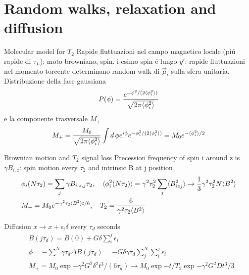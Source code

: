 \section{Random walks, relaxation and diffusion}

\begin{frame}{Molecular model for $T_2$}
Rapide fluttuazioni nel campo magnetico locale (pi\'u rapide di $\tau_L$): moto browniano, spin.
i-esimo spin \'e lungo $y'$: rapide fluttuazioni nel momento torcente determinano random walk di $\vec{\mu}_i$ sulla sfera unitaria. Distribuzione della fase gaussiana
\begin{equation*}
P(\phi)=\frac{e^{-\phi^2/(2\langle \phi_i^2 \rangle)}}{\sqrt{2\pi\langle \phi_i^2 \rangle}}    
\end{equation*}
e la componente trasversale $M_+$
\begin{equation*}
M_+=\frac{M_0}{\sqrt{2\pi\langle \phi_i^2 \rangle}}\int d\,\phi e^{i\phi}e^{-\phi_i^2/(2\langle \phi_i^2 \rangle)}=M_0e^{-\langle \phi_i^2 \rangle/2}
\end{equation*}
\begin{block}{Brownian motion and $T_2$ signal loss}
Precession frequency of spin i around z is $\gamma B_{i,z}$: spin motion every $\tau_2$ and intrinsic B at j position
\begin{align*}
&\phi_i(N\tau_2)=\sum_j\gamma B_{i,z,j}\tau_2,\quad \langle \phi_i^2(N\tau_2) \rangle=\gamma^2\tau_2^2\sum_j\langle B_{izj}^2 \rangle\to\frac{1}{3}\gamma^2\tau_2^2N\langle B^2 \rangle\\
&M_+=M_0e^{-\gamma^2\tau_2\langle B^2 \rangle t/6},\quad T_2=\frac{6}{\gamma^2\tau_2\langle B^2 \rangle}
\end{align*}
\end{block}
\end{frame}

\begin{frame}{Diffusion}
$x\to x+\epsilon_i\delta$ every $\tau_d$ seconds
\begin{align*}
&B(j\tau_d)=B(0)+G\delta\sum_i^j\epsilon_i\\
&\phi=-\sum^N\gamma\tau_d\Delta B(j\tau_d)=-G\delta\gamma\tau_d\sum_j^N\sum_i^j\epsilon_i\\
&M_+=M_0\exp{-\gamma^2 G^2\delta^2 t^3/(6\tau_d)}\to M_0\exp{-t/T_2}\exp{-\gamma^2 G^2Dt^3/3}
\end{align*}
\end{frame}